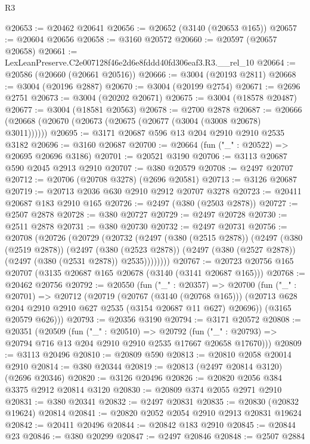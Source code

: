 \begin{lexlean}{R3}
\begin{coremodule}
@20653 := @20462 @20641
@20656 := @20652 (@3140 (@20653 @165))
@20657 := @20604 @20656
@20658 := @3160 @20572
@20660 := @20597 (@20657 @20658)
@20661 := LexLeanPreserve.C2e007128f46e2d6e8fddd40fd306eaf3.R3.__rel_10
@20664 := @20586 (@20660 (@20661 @20516))
@20666 := @3004 (@20193 @2811)
@20668 := @3004 (@20196 @2887)
@20670 := @3004 (@20199 @2754)
@20671 := @2696 @2751
@20673 := @3004 (@20202 @20671)
@20675 := @3004 (@18578 @20487)
@20677 := @3004 (@18581 @20563)
@20678 := @2700 @2878
@20687 := @20666 (@20668 (@20670 (@20673 (@20675 (@20677 (@3004 (@3008 @20678) @3011))))))
@20695 := @3171 @20687 @596 @13 @204 @2910 @2910 @2535 @3182
@20696 := @3160 @20687
@20700 := @20664 (fun ("_" : @20522) => @20695 @20696 @3186)
@20701 := @20521 @3190
@20706 := @3113 @20687 @590 @2045 @2913 @2910
@20707 := @380 @20579
@20708 := @2497 @20707
@20712 := @20706 (@20708 @3278) (@2696 @20581)
@20713 := @3126 @20687
@20719 := @20713 @2036 @630 @2910 @2912 @20707 @3278
@20723 := @20411 @20687 @183 @2910 @165
@20726 := @2497 (@380 (@2503 @2878))
@20727 := @2507 @2878
@20728 := @380 @20727
@20729 := @2497 @20728
@20730 := @2511 @2878
@20731 := @380 @20730
@20732 := @2497 @20731
@20756 := @20708
    (@20726
      (@20729
        (@20732
          (@2497
            (@380 (@2515 @2878))
            (@2497
              (@380 (@2519 @2878))
              (@2497
                (@380 (@2523 @2878))
                (@2497 (@380 (@2527 @2878)) (@2497 (@380 (@2531 @2878)) @2535))))))))
@20767 := @20723 @20756 @165 @20707 (@3135 @20687 @165 @20678 (@3140 (@3141 @20687 @165)))
@20768 := @20462 @20756
@20792 := @20550
    (fun ("_" : @20357) =>
    @20700
      (fun ("_" : @20701) =>
      @20712
        (@20719
          (@20767 (@3140 (@20768 @165)))
          (@20713 @628 @204 @2910 @2910 @627 @2535 (@3154 @20687 @11 @627) @20696))
        (@3165 @20579 @626)))
@20793 := @20356 @3190
@20794 := @3171 @20572
@20808 := @20351
    (@20509
      (fun ("_" : @20510) =>
      @20792 (fun ("_" : @20793) => @20794 @716 @13 @204 @2910 @2910 @2535 @17667 @20658 @17670)))
@20809 := @3113 @20496
@20810 := @20809 @590
@20813 := @20810 @2058 @20014 @2910
@20814 := @380 @20344
@20819 := @20813 (@2497 @20814 @3120) (@2696 @20346)
@20820 := @3126 @20496
@20826 := @20820 @2056 @384 @3375 @2912 @20814 @3120
@20830 := @20809 @374 @2055 @2971 @2910
@20831 := @380 @20341
@20832 := @2497 @20831
@20835 := @20830 (@20832 @19624) @20814
@20841 := @20820 @2052 @2054 @2910 @2913 @20831 @19624
@20842 := @20411 @20496
@20844 := @20842 @183 @2910
@20845 := @20844 @23
@20846 := @380 @20299
@20847 := @2497 @20846
@20848 := @2507 @2884

\end{coremodule}
\end{lexlean}
